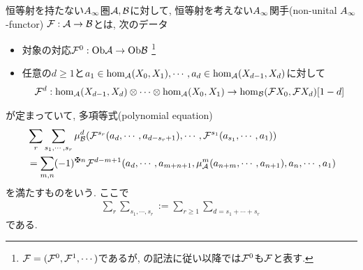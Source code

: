 \documentclass[uplatex, a4paper, 14Q, dvipdfmx]{jsarticle}
\begin{document}
\begin{definition}
  恒等射を持たない$A_{\infty}$圏$\mathcal{A}, \mathcal{B}$に対して, 恒等射を考えない$A_{\infty}$関手(non-unital $A_{\infty}$-functor) $\mathcal{F} : \mathcal{A} \to \mathcal{B}$とは, 次のデータ
  \begin{itemize}
    \item 対象の対応$\mathcal{F}^0 : \mathrm{Ob}\mathcal{A} \to \mathrm{Ob}\mathcal{B}$
    \footnote{
      $\mathcal{F}=(\mathcal{F}^0,\mathcal{F}^1,\cdots)$であるが, \cite{Sei}の記法に従い以降では$\mathcal{F}^0$も$\mathcal{F}$と表す. 
    }
    \item 任意の$d \geq 1$と$a_1 \in \hom_{\mathcal{A}}(X_0,X_1), \cdots, a_d \in \hom_{\mathcal{A}}(X_{d-1},X_d)$に対して
    \begin{align*}
      \mathcal{F}^d : \hom_{\mathcal{A}}(X_{d-1},X_d) \otimes \cdots \otimes \hom_{\mathcal{A}}(X_0,X_1) \to \hom_{\mathcal{B}}(\mathcal{F} X_0,\mathcal{F} X_d)[1-d]
    \end{align*}
  \end{itemize}
  が定まっていて, 多項等式(polynomial equation)
  \begin{align*}
    &\sum_r \sum_{s_1,\cdots,s_r} \mu^d_\B (\F^{s_r} (a_d,\cdots,a_{d-s_r+1}), \cdots, \F^{s_1}(a_{s_1},\cdots,a_1)) \\ 
    &= \sum_{m,n} (-1)^{\maltese n} \F^{d-m+1} (a_d,\cdots,a_{m+n+1}, \mu^m_\A(a_{n+m},\cdots,a_{n+1}), a_n,\cdots,a_1)
  \end{align*}
  を満たすものをいう. 
  ここで
  \begin{align*}
    \sum_r \sum_{s_1,\cdots,s_r} 
    := \sum_{r \geq 1} \sum_{d = s_1 + \cdots + s_r}
  \end{align*}
  である. 
\end{definition}
\end{document}
